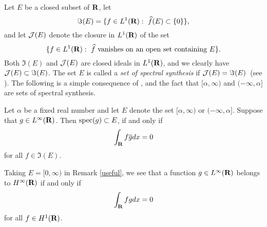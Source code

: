 Let $E$ be a closed subset of $\R$,
 let
$$\Im(E)=\{ f\in L^1(\R):\ \widehat{f}(E)\subset\{0\}\},$$
 and let ${\cal J}(E)$
denote the closure in $L^1(\R)$ of the set
$$\{f\in L^1(\R):\ \widehat{f}\ 
{\rm vanishes\ on \ an\ open\ set\ containing }\ E\}.$$
Both $\Im(E)$ and ${\cal J}(E)$ are closed ideals in $L^1(\R)$,
and we clearly have ${\cal J}(E)\subset \Im(E)$.
The set $E$ is called a {\em set of spectral synthesis}
if ${\cal J}(E)= \Im(E)$\ (see \cite[Theorem (40.10)]{hr2}).  
The following is a simple consequence of \cite[Theorems (40.8), and (40.10)(iii)]{hr2}, and the 
fact that $[\alpha,\infty)$ and
$(-\infty ,\alpha]$ are sets of spectral synthesis.
\begin{useful}
Let $\alpha $ be a fixed real number and let $E$
denote the set $[\alpha,\infty)$ or
$(-\infty ,\alpha]$.
Suppose that $g\in L^\infty(\R)$.
  Then ${\rm spec} (g)\subset E$,
if and only if
$$\int_\R f\overline{g} dx=0$$
for all $f\in \Im (E)$.
\label{useful}
\end{useful}
Taking $E=[0,\infty)$ in Remark \ref{useful},
we see that a function $g\in L^\infty(\R)$ belongs to
$H^\infty(\R)$ if and only if
\begin{equation}
\int_\R f g d x = 0
\label{hinfty}
\end{equation}
for all $f\in H^1(\R)$.

